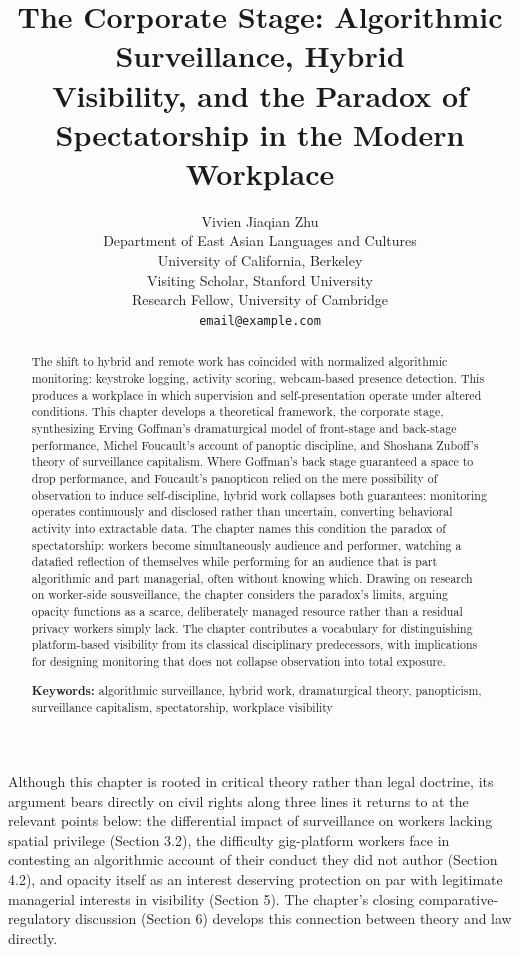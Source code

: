 \documentclass[10pt]{article}
\title{\Large\bfseries The Corporate Stage: Algorithmic Surveillance, Hybrid\\
Visibility, and the Paradox of Spectatorship in the Modern\\
Workplace}
\author{
Vivien Jiaqian Zhu\\
\small Department of East Asian Languages and Cultures\\
\small University of California, Berkeley\\
\small Visiting Scholar, Stanford University\\
\small Research Fellow, University of Cambridge\\
\small \texttt{email@example.com}
}
\date{}
\begin{document}
\maketitle

\begin{abstract}
\noindent The shift to hybrid and remote work has coincided with normalized algorithmic monitoring: keystroke logging, activity scoring, webcam-based presence detection. This produces a workplace in which supervision and self-presentation operate under altered conditions. This chapter develops a theoretical framework, the corporate stage, synthesizing Erving Goffman's dramaturgical model of front-stage and back-stage performance, Michel Foucault's account of panoptic discipline, and Shoshana Zuboff's theory of surveillance capitalism. Where Goffman's back stage guaranteed a space to drop performance, and Foucault's panopticon relied on the mere possibility of observation to induce self-discipline, hybrid work collapses both guarantees: monitoring operates continuously and disclosed rather than uncertain, converting behavioral activity into extractable data. The chapter names this condition the paradox of spectatorship: workers become simultaneously audience and performer, watching a datafied reflection of themselves while performing for an audience that is part algorithmic and part managerial, often without knowing which. Drawing on research on worker-side sousveillance, the chapter considers the paradox's limits, arguing opacity functions as a scarce, deliberately managed resource rather than a residual privacy workers simply lack. The chapter contributes a vocabulary for distinguishing platform-based visibility from its classical disciplinary predecessors, with implications for designing monitoring that does not collapse observation into total exposure.

\vspace{0.5em}
\noindent\textbf{Keywords:} algorithmic surveillance, hybrid work, dramaturgical theory, panopticism, surveillance capitalism, spectatorship, workplace visibility
\end{abstract}

Although this chapter is rooted in critical theory rather than legal doctrine, its argument bears directly on civil rights along three lines it returns to at the relevant points below: the differential impact of surveillance on workers lacking spatial privilege (Section 3.2), the difficulty gig-platform workers face in contesting an algorithmic account of their conduct they did not author (Section 4.2), and opacity itself as an interest deserving protection on par with legitimate managerial interests in visibility (Section 5). The chapter's closing comparative-regulatory discussion (Section 6) develops this connection between theory and law directly.
\end{document}
